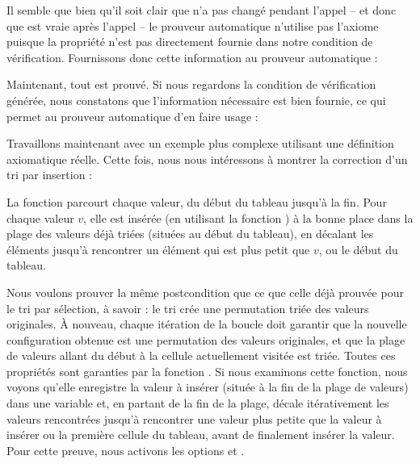 



Il semble que bien qu'il soit clair que  n'a pas changé
pendant l'appel  -- et donc que 
est vraie après l'appel -- le prouveur automatique n'utilise pas l'axiome
 puisque la propriété n'est pas directement fournie dans
notre condition de vérification. Fournissons donc cette information au prouveur
automatique :





Maintenant, tout est prouvé. Si nous regardons la condition de vérification générée,
nous constatons que l'information nécessaire est bien fournie, ce qui permet
au prouveur automatique d'en faire usage :






Travaillons maintenant avec un exemple plus complexe utilisant une définition
axiomatique réelle. Cette fois, nous nous intéressons à montrer la correction
d'un tri par insertion :




La fonction  parcourt chaque valeur, du début du tableau
jusqu'à la fin. Pour chaque valeur $v$, elle est insérée (en utilisant la fonction
) à la bonne place dans la plage des valeurs déjà triées
(situées au début du tableau), en décalant les éléments jusqu'à
rencontrer un élément qui est plus petit que $v$, ou le début du tableau.



Nous voulons prouver la même postcondition que ce que celle déjà prouvée pour
le tri par sélection, à savoir : le tri crée une permutation triée des
valeurs originales. À nouveau, chaque itération de la boucle doit garantir que la
nouvelle configuration obtenue est une permutation des valeurs originales, et que
la plage de valeurs allant du début à la cellule actuellement visitée est triée.
Toutes ces propriétés sont garanties par la fonction . Si
nous examinons cette fonction, nous voyons qu'elle enregistre la
valeur à insérer (située à la fin de la plage de valeurs) dans une variable
 et, en partant de la fin de la plage, décale itérativement
les valeurs rencontrées jusqu'à rencontrer une valeur plus petite que la valeur à
insérer ou la première cellule du tableau, avant de finalement insérer la valeur.
Pour cette preuve, nous activons les options 
et .




